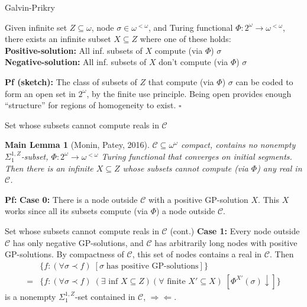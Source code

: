 \begin{frame}{Galvin-Prikry}
  \begin{fact*}
    Given infinite set $Z\subseteq\omega$, node $\sigma\in\omega^{<\omega}$,
    and Turing functional $\Phi:2^\omega\rightarrow \omega^{<\omega}$,
    there exists an infinite subset $X\subseteq Z$ where one of these
    holds:\\

    \vspace{1em}
    \textbf{Positive-solution:} All inf. subsets of $X$ compute (via
    $\Phi$) $\sigma$ \\
    \textbf{Negative-solution:} All inf. subsets of $X$ don't compute (via
    $\Phi$) $\sigma$
  \end{fact*}

  \vspace{1em}
  \textbf{Pf (sketch):} The class of subsets of $Z$ that compute (via
  $\Phi$) $\sigma$ can be coded to form an open set in $2^\omega$, by the
  finite use principle. Being open provides enough ``structure'' for
  regions of homogeneity to exist. $\square$
\end{frame}

\begin{frame}{Set whose subsets cannot compute reals in $\mathcal{C}$}
  \newtheorem*{main-lemma*}{Main Lemma}
  \begin{main-lemma*}[Monin, Patey, 2016]
    $\mathcal{C}\subseteq\omega^\omega$ compact, contains no nonempty
    $\Sigma_1^{1,Z}$-subset, $\Phi:2^{\omega}\rightarrow \omega^{<\omega}$
    Turing functional that converges on initial segments. Then there is an
    infinite $X\subseteq Z$ whose subsets cannot compute (via $\Phi$) any
    real in $\mathcal{C}$.
  \end{main-lemma*}

  \vspace{0.5em}
  \textbf{Pf:} \textbf{Case 0:} There is a node outside
  $\mathcal{C}$ with a positive GP-solution $X$. This $X$ works since
  all its subsets compute (via $\Phi$) a node outside $\mathcal{C}$.
\end{frame}

\begin{frame}{Set whose subsets cannot compute reals in $\mathcal{C}$
(cont.)}
  \textbf{Case 1:} Every node outside $\mathcal{C}$ has only negative
  GP-solutions, and $\mathcal{C}$ has arbitrarily long nodes with
  positive GP-solutions. By compactness of $\mathcal{C}$, this set of
  nodes contains a real in $\mathcal{C}$. Then
  \begin{align*}
    &\{f:(\forall \sigma\prec f)\; [\sigma\; \text{has
    positive GP-solutions}]\}\\
    =&\{f:(\forall \sigma\prec f)\; (\exists \text{ inf } X\subseteq
    Z)(\forall \text{ finite } X'\subseteq X)\;
    [\Phi^{X'}(\sigma)\downarrow]\}
  \end{align*}
  is a nonempty $\Sigma_1^{1,Z}$-set contained
  in $\mathcal{C}$, $\Rightarrow\Leftarrow$.
\end{frame}

